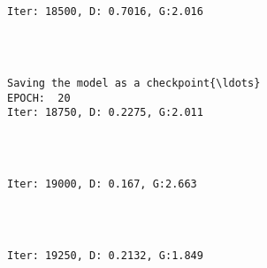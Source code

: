 \documentclass[11pt]{article}
\begin{document}
    \begin{center}
    \end{center}
    { \hspace*{\fill} \\}
    
    \begin{Verbatim}[commandchars=\\\{\}]

Iter: 18500, D: 0.7016, G:2.016
    \end{Verbatim}

    \begin{center}
    \end{center}
    { \hspace*{\fill} \\}
    
    \begin{Verbatim}[commandchars=\\\{\}]

Saving the model as a checkpoint{\ldots}
EPOCH:  20
Iter: 18750, D: 0.2275, G:2.011
    \end{Verbatim}

    \begin{center}
    \end{center}
    { \hspace*{\fill} \\}
    
    \begin{Verbatim}[commandchars=\\\{\}]

Iter: 19000, D: 0.167, G:2.663
    \end{Verbatim}

    \begin{center}
    \end{center}
    { \hspace*{\fill} \\}
    
    \begin{Verbatim}[commandchars=\\\{\}]

Iter: 19250, D: 0.2132, G:1.849
    \end{Verbatim}
\end{document}
